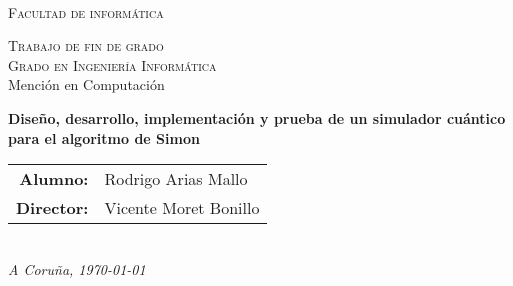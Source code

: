 \begin{titlepage}




	\begin{center}


		 \\
		\vspace{0.5cm}
		\textsc{Facultad de informática}
		\vspace{1.5cm}

		
		\textsc{\Large Trabajo de fin de grado} \\
		\vspace{0.7cm}
		\textsc{\Large Grado en Ingeniería Informática} \\
		\vspace{0.5cm}
		Mención en Computación \\
		\vspace{4cm}

		\textbf{\LARGE Diseño, desarrollo, implementación y prueba de un
		simulador cuántico para el algoritmo de Simon}
		\vspace{4cm}
	\end{center}

	\begin{flushright}
		\begin{tabular}{rl}
			\large{\textbf{Alumno:}}	&
			\large{Rodrigo Arias Mallo} \\

			\large{\textbf{Director:}}	&
			\large{Vicente Moret Bonillo} \\

		\end{tabular}
		\\
		\vspace{1cm}
		\textsl{\large A Coruña, \today} \\
	\end{flushright}

\end{titlepage}

